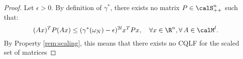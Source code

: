 \begin{proof}
Let $\epsilon >0$. By definition of $\gamma^{*}$, there exists no matrix $P \in \calS^n_{++}$ such that:
\begin{equation*}
(Ax)^T P (Ax) \leq (\gamma^*(\omega_N) -\epsilon)^{2l}x^TPx,\quad \forall x \in \R^n, \forall\, A \in \calM^{l}.
\end{equation*}
By Property \ref{rem:scaling}, this means that there exists no CQLF for the scaled set of matrices 
\end{proof}

